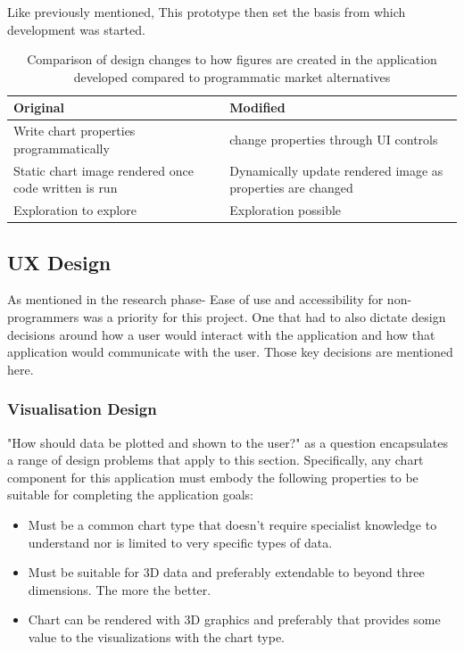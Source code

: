 Like previously mentioned, This prototype then set the basis from which development was started.

\begin{table}[t]
    \begin{tabular}{ | l | l | }
        \hline
        Original                                             & Modified                                                    \\
        \hline
        Write chart properties programmatically              & change properties through UI controls                       \\
        \hline
        Static chart image rendered once code written is run & Dynamically update rendered image as properties are changed \\
        \hline
        Exploration to explore                               & Exploration possible                                        \\
        \hline
    \end{tabular}
    \caption{Comparison of design changes to how figures are created in the application developed compared to programmatic market alternatives}
    \label{}
\end{table}

\subsection{UX Design}

As mentioned in the research phase- Ease of use and accessibility for non-programmers was a priority for this project. One that had to also dictate design decisions around how a user would interact with the application and how that application would communicate with the user. Those key decisions are mentioned here.

\subsubsection{Visualisation Design}
"How should data be plotted and shown to the user?" as a question encapsulates a range of design problems that apply to this section. Specifically, any chart component for this application must embody the following properties to be suitable for completing the application goals:
\begin{itemize}
    \item Must be a common chart type that doesn't require specialist knowledge to understand nor is limited to very specific types of data.
    \item Must be suitable for 3D data and preferably extendable to beyond three dimensions. The more the better.
    \item Chart can be rendered with 3D graphics and preferably that provides some value to the visualizations with the chart type.
\end{itemize}

